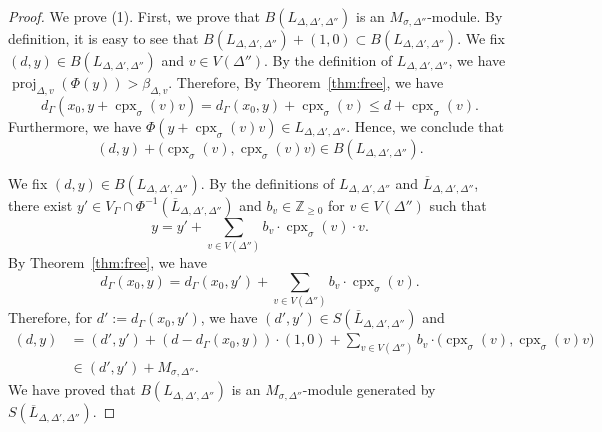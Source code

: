 \documentclass[11pt]{article}
\theoremstyle{definition}
\numberwithin{equation}{section}
\begin{document}
\begin{proof}
We prove (1). First, we prove that $B \left( L_{\Delta, \Delta ', \Delta''} \right)$ is an  $M_{\sigma, \Delta ''}$-module. 
By definition, it is easy to see that $B \left( L_{\Delta, \Delta ', \Delta''} \right) + (1,0) \subset B \left( L_{\Delta, \Delta ', \Delta''} \right)$. 
We fix $(d, y) \in B \left( L_{\Delta, \Delta ', \Delta''} \right)$ and $v \in V(\Delta'')$. 
By the definition of $L_{\Delta, \Delta ', \Delta''}$, we have $\operatorname{proj}_{\Delta, v} (\Phi (y)) > \beta _{\Delta, v}$. 
Therefore, By Theorem~\ref{thm:free}, we have 
\[
d_{\Gamma}(x_0, y + \operatorname{cpx}_{\sigma}(v) v) 
= d_{\Gamma}(x_0, y) + \operatorname{cpx}_{\sigma}(v) 
\le d + \operatorname{cpx}_{\sigma}(v). 
\]
Furthermore, we have $\Phi (y + \operatorname{cpx}_{\sigma}(v) v) \in L_{\Delta, \Delta ', \Delta''}$. 
Hence, we conclude that 
\[
(d,y) + \bigl( \operatorname{cpx}_{\sigma}(v), \operatorname{cpx}_{\sigma}(v) v \bigr) \in B \left( L_{\Delta, \Delta ', \Delta''} \right). 
\]

We fix $(d, y) \in B \left( L_{\Delta, \Delta ', \Delta''} \right)$. 
By the definitions of $L_{\Delta, \Delta ', \Delta''}$ and $\overline{L}_{\Delta, \Delta ', \Delta''}$, 
there exist $y' \in V_{\Gamma} \cap \Phi^{-1} \left( \overline{L}_{\Delta, \Delta ', \Delta''} \right)$ and 
$b_v \in \mathbb{Z}_{\ge 0}$ for $v \in V(\Delta '')$ such that 
\[
y = y' + \sum _{v \in V(\Delta '')} b_v \cdot \operatorname{cpx}_{\sigma}(v) \cdot v. 
\]
By Theorem~\ref{thm:free}, we have 
\[
d_{\Gamma}(x_0, y) 
= d_{\Gamma}(x_0, y') + \sum _{v \in V(\Delta '')} b_v \cdot \operatorname{cpx}_{\sigma}(v).
\]
Therefore, for $d' := d_{\Gamma}(x_0, y')$, we have $(d', y') \in S \left(\overline{L}_{\Delta, \Delta ', \Delta''} \right)$ and 
\begin{align*}
(d,y) 
&= 
\left( d', y' \right) + \left( d-d_{\Gamma}(x_0, y) \right) \cdot (1, 0) 
+ \sum _{v \in V(\Delta '')} b_v \cdot \bigl( \operatorname{cpx}_{\sigma}(v), \operatorname{cpx}_{\sigma}(v) v \bigr) \\
&\in
\left( d', y' \right) + M_{\sigma, \Delta ''}. 
\end{align*}
We have proved that $B \left( L_{\Delta, \Delta ', \Delta''} \right)$ is an $M_{\sigma, \Delta ''}$-module generated by 
$S \left(\overline{L}_{\Delta, \Delta ', \Delta''} \right)$. 


\end{proof}
\end{document}
